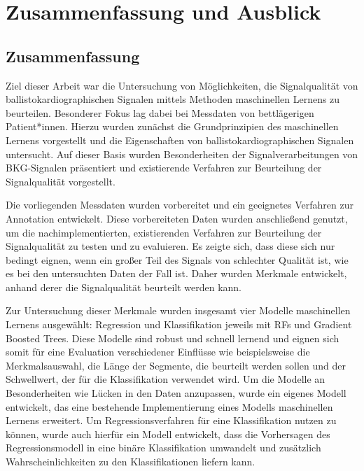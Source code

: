 \chapter{Zusammenfassung und Ausblick}\label{zusammenfassung}

\section{Zusammenfassung}

Ziel dieser Arbeit war die Untersuchung von Möglichkeiten, die Signalqualität von ballistokardiographischen Signalen mittels Methoden maschinellen Lernens zu beurteilen. Besonderer Fokus lag dabei bei Messdaten von bettlägerigen Patient*innen. Hierzu wurden zunächst die Grundprinzipien des maschinellen Lernens vorgestellt und die Eigenschaften von ballistokardiographischen Signalen untersucht. Auf dieser Basis wurden Besonderheiten der Signalverarbeitungen von \ac{BKG}-Signalen präsentiert und existierende Verfahren zur Beurteilung der Signalqualität vorgestellt.

Die vorliegenden Messdaten wurden vorbereitet und ein geeignetes Verfahren zur Annotation entwickelt. Diese vorbereiteten Daten wurden anschließend genutzt, um die nachimplementierten, existierenden Verfahren zur Beurteilung der Signalqualität zu testen und zu evaluieren. Es zeigte sich, dass diese sich nur bedingt eignen, wenn ein großer Teil des Signals von schlechter Qualität ist, wie es bei den untersuchten Daten der Fall ist. Daher wurden Merkmale entwickelt, anhand derer die Signalqualität beurteilt werden kann.

Zur Untersuchung dieser Merkmale wurden insgesamt vier Modelle maschinellen Lernens ausgewählt: Regression und Klassifikation jeweils mit \acl{RF}s und Gradient Boosted Trees. Diese Modelle sind robust und schnell lernend und eignen sich somit für eine Evaluation verschiedener Einflüsse wie beispielsweise die Merkmalsauswahl, die Länge der Segmente, die beurteilt werden sollen und der Schwellwert, der für die Klassifikation verwendet wird. Um die Modelle an Besonderheiten wie Lücken in den Daten anzupassen, wurde ein eigenes Modell entwickelt, das eine bestehende Implementierung eines Modells maschinellen Lernens erweitert. Um Regressionsverfahren für eine Klassifikation nutzen zu können, wurde auch hierfür ein Modell entwickelt, dass die Vorhersagen des Regressionsmodell in eine binäre Klassifikation umwandelt und zusätzlich Wahrscheinlichkeiten zu den Klassifikationen liefern kann.

